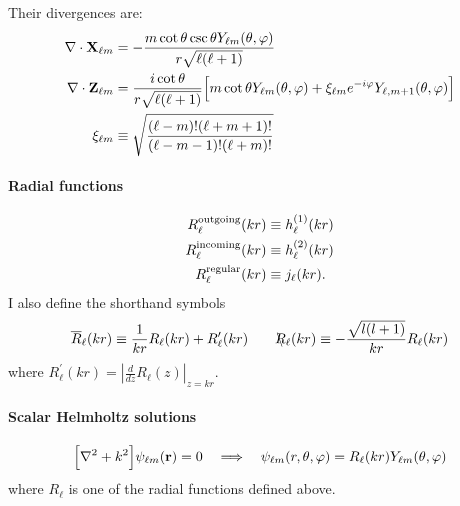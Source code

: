 \documentclass[letterpaper]{article}
\newcommand{\lm}{_{\ell m}}
\newcommand{\RBar}{\overline{R}}
\newcommand{\RSlash}{\backslash\hspace{-0.08in}R}
\begin{document}
Their divergences are:
\begin{subequations}
\begin{align}
\nabla \cdot \vb X\lm
 &=-\frac{m\cot\theta\csc\theta Y\lm(\theta,\varphi)}
         {r\sqrt{\ell(\ell+1)}}
\\
\nabla \cdot \vb Z\lm
 &= \frac{i\cot\theta}{r \sqrt{\ell(\ell+1)}}
    \Big[ m\cot\theta Y\lm(\theta, \varphi)
          + \xi\lm e^{-i\varphi}Y_{\ell,m+1}(\theta,\varphi)
    \Big]
\\
\xi\lm&\equiv\sqrt\frac{ (\ell-m)! (\ell+m+1)!}{(\ell-m-1)!(\ell+m)!}
\end{align}
\label{XZDivergences}
\end{subequations}

\paragraph{Radial functions}
\begin{align*}
 R_\ell ^{\text{\scriptsize outgoing}}(kr)  &\equiv h^{(1)}_\ell(kr) \\
 R_\ell ^{\text{\scriptsize incoming}}(kr)  &\equiv h^{(2)}_\ell(kr) \\
 R_\ell ^{\text{\scriptsize regular}}(kr)   &\equiv j_\ell(kr).
\end{align*}
I also define the shorthand symbols
$$ \RBar_\ell(kr)
   \equiv 
   \frac{1}{kr}R_\ell(kr) + R^\prime_\ell(kr)
   \qquad
   \RSlash_\ell(kr) \equiv -\frac{\sqrt{l(l+1)}}{kr} R_\ell(kr)
$$
where $R^\prime_\ell(kr) = \left|\frac{d}{dz}R_\ell(z)\right|_{z=kr}.$

\paragraph{Scalar Helmholtz solutions}

$$ \Big[ \nabla^2 + k^2\Big]\psi\lm(\vb r) = 0
   \whereupon
   \psi\lm(r,\theta,\varphi)=R_\ell(kr) Y_{\ell m}(\theta,\varphi)
$$
where $R_\ell$ is one of the radial functions defined above.
\end{document}
